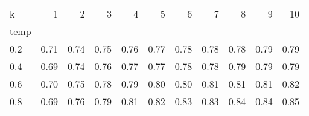 \begin{tabular}{lrrrrrrrrrr}
\toprule
k & 1 & 2 & 3 & 4 & 5 & 6 & 7 & 8 & 9 & 10 \\
temp &  &  &  &  &  &  &  &  &  &  \\
\midrule
0.2 & 0.71 & 0.74 & 0.75 & 0.76 & 0.77 & 0.78 & 0.78 & 0.78 & 0.79 & 0.79 \\
0.4 & 0.69 & 0.74 & 0.76 & 0.77 & 0.77 & 0.78 & 0.78 & 0.79 & 0.79 & 0.79 \\
0.6 & 0.70 & 0.75 & 0.78 & 0.79 & 0.80 & 0.80 & 0.81 & 0.81 & 0.81 & 0.82 \\
0.8 & 0.69 & 0.76 & 0.79 & 0.81 & 0.82 & 0.83 & 0.83 & 0.84 & 0.84 & 0.85 \\
\bottomrule
\end{tabular}
